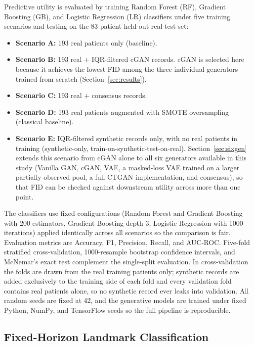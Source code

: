\documentclass[journal]{IEEEtran}
\begin{document}
Predictive utility is evaluated by training Random Forest (RF), Gradient Boosting (GB), and Logistic Regression (LR) classifiers under five training scenarios and testing on the 83-patient held-out real test set:
\begin{itemize}
  \item \textbf{Scenario A:} 193 real patients only (baseline).
  \item \textbf{Scenario B:} 193 real + IQR-filtered cGAN records. cGAN is selected here because it achieves the lowest FID among the three individual generators trained from scratch (Section~\ref{sec:results}).
  \item \textbf{Scenario C:} 193 real + consensus records.
  \item \textbf{Scenario D:} 193 real patients augmented with SMOTE oversampling (classical baseline).
  \item \textbf{Scenario E:} IQR-filtered synthetic records only, with no real patients in training (synthetic-only, train-on-synthetic-test-on-real). Section~\ref{sec:sixgen} extends this scenario from cGAN alone to all six generators available in this study (Vanilla GAN, cGAN, VAE, a masked-loss VAE trained on a larger partially observed pool, a full CTGAN implementation, and consensus), so that FID can be checked against downstream utility across more than one point.
\end{itemize}
The classifiers use fixed configurations (Random Forest and Gradient Boosting with 200 estimators, Gradient Boosting depth 3, Logistic Regression with 1000 iterations) applied identically across all scenarios so the comparison is fair. Evaluation metrics are Accuracy, F1, Precision, Recall, and AUC-ROC. Five-fold stratified cross-validation, 1000-resample bootstrap confidence intervals, and McNemar's exact test complement the single-split evaluation. In cross-validation the folds are drawn from the real training patients only; synthetic records are added exclusively to the training side of each fold and every validation fold contains real patients alone, so no synthetic record ever leaks into validation. All random seeds are fixed at 42, and the generative models are trained under fixed Python, NumPy, and TensorFlow seeds so the full pipeline is reproducible.

\subsection{Fixed-Horizon Landmark Classification}
\label{sec:landmark}
\end{document}
